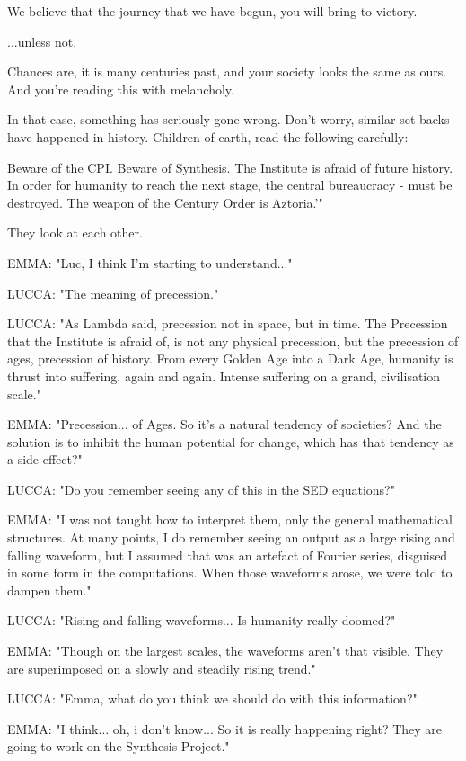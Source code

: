 \documentclass[11pt]{article}
\begin{document}
We believe that the journey that we have begun, you will bring to victory.

...unless not.

Chances are, it is many centuries past, and your society looks the same as ours.
And you're reading this with melancholy.

In that case, something has seriously gone wrong.
Don't worry, similar set backs have happened in history.
Children of earth, read the following carefully:

Beware of the CPI. 
Beware of Synthesis.
The Institute is afraid of future history.
In order for humanity to reach the next stage, the central bureaucracy - must be destroyed.
The weapon of the Century Order is Aztoria.'"

They look at each other.

EMMA: "Luc, I think I'm starting to understand..."

LUCCA: "The meaning of precession."

LUCCA: "As Lambda said, precession not in space, but in time.
The Precession that the Institute is afraid of, is not any physical precession, but the precession of ages, precession of history.
From every Golden Age into a Dark Age, humanity is thrust into suffering, again and again.
Intense suffering on a grand, civilisation scale."

EMMA: "Precession... of Ages.
So it's a natural tendency of societies?
And the solution is to inhibit the human potential for change, which has that tendency as a side effect?"

LUCCA: "Do you remember seeing any of this in the SED equations?"

EMMA: "I was not taught how to interpret them, only the general mathematical structures.
At many points, I do remember seeing an output as a large rising and falling waveform, but I assumed that was an artefact of Fourier series, disguised in some form in the computations.
When those waveforms arose, we were told to dampen them."

LUCCA: "Rising and falling waveforms...
Is humanity really doomed?"

EMMA: "Though on the largest scales, the waveforms aren't that visible.
They are superimposed on a slowly and steadily rising trend."

LUCCA: "Emma, what do you think we should do with this information?"

EMMA: "I think... oh, i don't know...
So it is really happening right?
They are going to work on the Synthesis Project."
\end{document}
